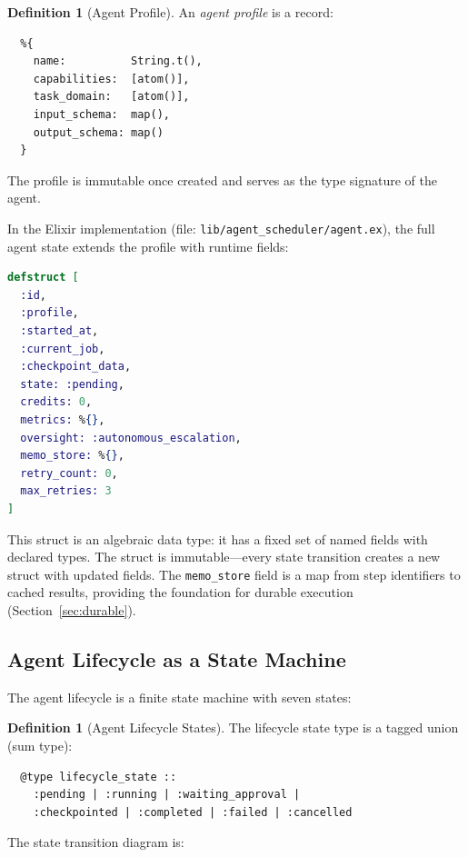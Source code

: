 \documentclass[12pt,a4paper]{article}
\theoremstyle{definition}
\newtheorem{definition}[theorem]{Definition}
\theoremstyle{remark}
\begin{document}
\begin{definition}[Agent Profile]\label{def:agent-profile}
An \emph{agent profile} is a record:
\begin{verbatim}
  %{
    name:          String.t(),
    capabilities:  [atom()],
    task_domain:   [atom()],
    input_schema:  map(),
    output_schema: map()
  }
\end{verbatim}
The profile is immutable once created and serves as the type signature of the agent.
\end{definition}

In the Elixir implementation (file: \texttt{lib/agent\_scheduler/agent.ex}), the full agent state extends the profile with runtime fields:

\begin{lstlisting}[language=elixir, caption={Agent struct definition from \texttt{agent.ex}}, label={lst:agent-struct}]
defstruct [
  :id,
  :profile,
  :started_at,
  :current_job,
  :checkpoint_data,
  state: :pending,
  credits: 0,
  metrics: %{},
  oversight: :autonomous_escalation,
  memo_store: %{},
  retry_count: 0,
  max_retries: 3
]
\end{lstlisting}

This struct is an algebraic data type: it has a fixed set of named fields with declared types. The struct is immutable---every state transition creates a new struct with updated fields. The \texttt{memo\_store} field is a map from step identifiers to cached results, providing the foundation for durable execution (Section~\ref{sec:durable}).

\subsection{Agent Lifecycle as a State Machine}

The agent lifecycle is a finite state machine with seven states:

\begin{definition}[Agent Lifecycle States]\label{def:lifecycle}
The lifecycle state type is a tagged union (sum type):
\begin{verbatim}
  @type lifecycle_state ::
    :pending | :running | :waiting_approval |
    :checkpointed | :completed | :failed | :cancelled
\end{verbatim}
\end{definition}

The state transition diagram is:
\end{document}
